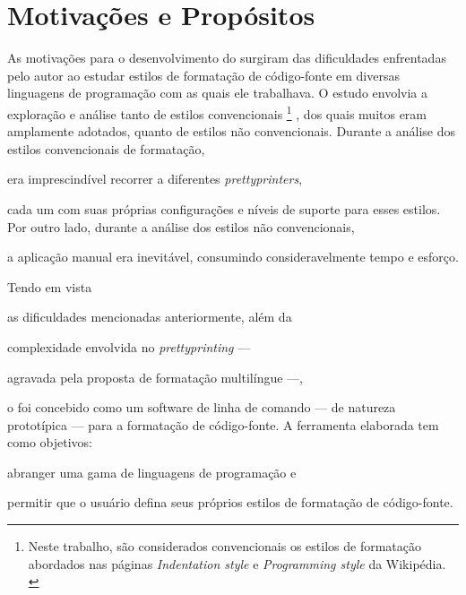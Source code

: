 \documentclass
  [11pt,a4paper,english,brazil,openright,sumario=tradicional,twoside]
  {abntex2}
\begin{document}
  \section{Motivações e Propósitos}

  As motivações para o desenvolvimento do \witchcooking surgiram das
  dificuldades enfrentadas pelo autor ao estudar estilos de formatação de
  código-fonte em diversas linguagens de programação com as quais ele
  trabalhava. O estudo envolvia a exploração e análise tanto de estilos
  convencionais%
  \footnote
    { Neste trabalho, são considerados convencionais os estilos de formatação
      abordados nas páginas \textit{Indentation style} e
      \textit{Programming style} da Wikipédia.
      \cites{wiki-2023-indentation}{wiki-2023-programming}}%
  , dos quais muitos eram amplamente adotados, quanto de estilos
  não convencionais. Durante a análise dos estilos convencionais de formatação,
  \begin{inparaenum}
    \item era imprescindível recorrer a diferentes \textit{prettyprinters},
    \item cada um com suas próprias configurações e níveis de suporte para
          esses estilos. Por outro lado, durante a análise dos estilos
          não convencionais,
    \item a aplicação manual era inevitável, consumindo consideravelmente tempo
          e esforço.
  \end{inparaenum}

  Tendo em vista
  \begin{inparaenum}
    \item as dificuldades mencionadas anteriormente, além da
    \item complexidade envolvida no \textit{prettyprinting} ---
    \item agravada pela proposta de formatação multilíngue ---,
  \end{inparaenum}
  o \witchcooking foi concebido como um software de linha de comando --- de
  natureza prototípica --- para a formatação de código-fonte. A ferramenta
  elaborada tem como objetivos:
  \begin{inparaenum}
    \item abranger uma gama de linguagens de programação e
    \item permitir que o usuário defina seus próprios estilos de formatação
          de código-fonte.
  \end{inparaenum}
\end{document}
